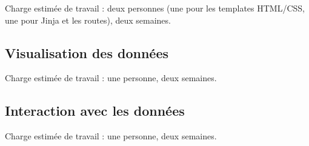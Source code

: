 \documentclass[12pt]{article}
\begin{document}
	Charge estimée de travail : deux personnes (une pour les templates HTML/CSS, une pour Jinja et les routes), deux semaines.
	
	\subsection*{Visualisation des données}
	
	Charge estimée de travail : une personne, deux semaines.
	
	\subsection*{Interaction avec les données}
	
	Charge estimée de travail : une personne, deux semaines.
		
\end{document}
